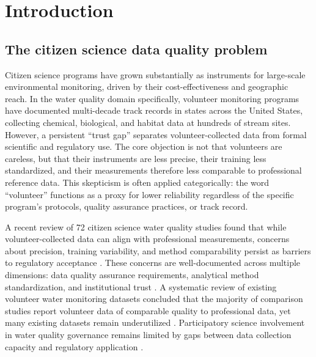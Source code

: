 \documentclass[lineno]{wlpeerj}
\begin{document}
\flushbottom
\maketitle
\thispagestyle{empty}

\section{Introduction}

\subsection{The citizen science data quality problem}

Citizen science programs have grown substantially as instruments for large-scale environmental monitoring, driven by their cost-effectiveness and geographic reach. In the water quality domain specifically, volunteer monitoring programs have documented multi-decade track records in states across the United States, collecting chemical, biological, and habitat data at hundreds of stream sites. However, a persistent ``trust gap'' separates volunteer-collected data from formal scientific and regulatory use. The core objection is not that volunteers are careless, but that their instruments are less precise, their training less standardized, and their measurements therefore less comparable to professional reference data. This skepticism is often applied categorically: the word ``volunteer'' functions as a proxy for lower reliability regardless of the specific program's protocols, quality assurance practices, or track record.

A recent review of 72 citizen science water quality studies found that while volunteer-collected data can align with professional measurements, concerns about precision, training variability, and method comparability persist as barriers to regulatory acceptance \citep{BlancoRamirez2023}. These concerns are well-documented across multiple dimensions: data quality assurance requirements, analytical method standardization, and institutional trust \citep{SanLlorenteCapdevila2020,Metcalfe2022}. A systematic review of existing volunteer water monitoring datasets concluded that the majority of comparison studies report volunteer data of comparable quality to professional data, yet many existing datasets remain underutilized \citep{Albus2019}. Participatory science involvement in water quality governance remains limited by gaps between data collection capacity and regulatory application \citep{ORyan2025}.
\end{document}
